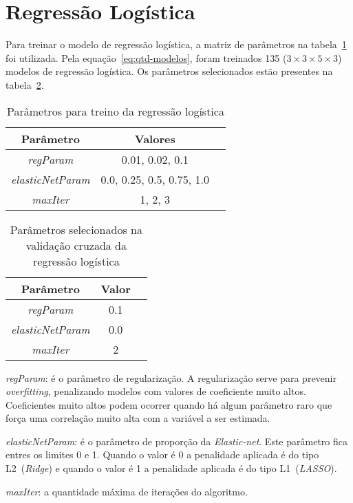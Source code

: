 \section{Regressão Logística}
\label{sec:lr}

Para treinar o modelo de regressão logística, a matriz de parâmetros na tabela~\ref{tab:param-lr} foi utilizada.
Pela equação~\ref{eq:qtd-modelos}, foram treinados 135 ($3 \times 3 \times 5 \times 3$) modelos de regressão logística.
Os parâmetros selecionados estão presentes na tabela~\ref{tab:param-final-lr}.

\begin{table}[h]
    \centering
    \begin{tabular}{|c|c|c|}
        \hline
        Parâmetro                & Valores                   \\ \hline
        \textit{regParam}        & 0.01, 0.02, 0.1           \\
        \textit{elasticNetParam} & 0.0, 0.25, 0.5, 0.75, 1.0 \\
        \textit{maxIter}         & 1, 2, 3                   \\ \hline
    \end{tabular}
    \caption{Parâmetros para treino da regressão logística}
    \label{tab:param-lr}
\end{table}

\begin{table}[h]
    \centering
    \begin{tabular}{|c|c|c|}
        \hline
        Parâmetro                & Valor \\ \hline
        \textit{regParam}        & 0.1   \\
        \textit{elasticNetParam} & 0.0   \\
        \textit{maxIter}         & 2     \\ \hline
    \end{tabular}
    \caption{Parâmetros selecionados na validação cruzada da regressão logística}
    \label{tab:param-final-lr}
\end{table}

\textit{regParam}: é o parâmetro de regularização.
A regularização serve para prevenir \textit{overfitting}, penalizando modelos com valores de coeficiente muito altos.
Coeficientes muito altos podem ocorrer quando há algum parâmetro raro que força uma correlação muito alta com a variável a ser estimada.

\textit{elasticNetParam}: é o parâmetro de proporção da \textit{Elastic-net}.
Este parâmetro fica entres os limites 0 e 1.
Quando o valor é 0 a penalidade aplicada é do tipo L2~(\textit{Ridge}) e quando o valor é 1 a penalidade aplicada é do tipo L1~(\textit{LASSO}).

\textit{maxIter}: a quantidade máxima de iterações do algoritmo.
